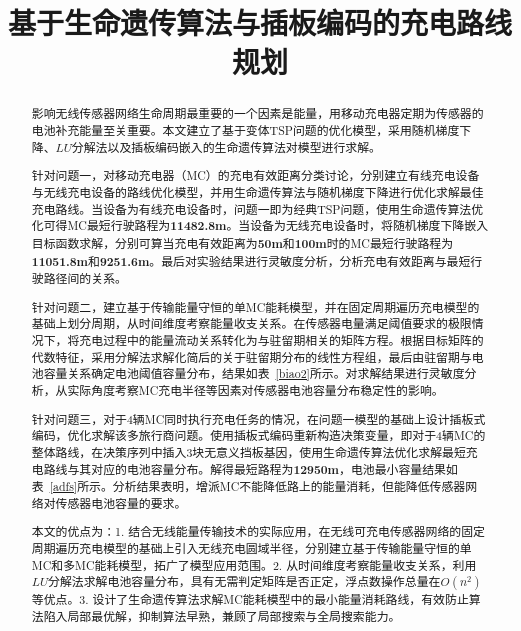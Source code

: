 \documentclass{whutmod}
\title{基于生命遗传算法与插板编码的充电路线规划}
\begin{document}
    \maketitle
    \thispagestyle{empty}

    \begin{abstract}
        影响无线传感器网络生命周期最重要的一个因素是能量，用移动充电器定期为传感器的电池补充能量至关重要。本文建立了基于变体TSP问题的优化模型，采用随机梯度下降、$LU$分解法以及插板编码嵌入的生命遗传算法对模型进行求解。

        针对问题一，对移动充电器（MC）的充电有效距离分类讨论，分别建立有线充电设备与无线充电设备的路线优化模型，并用生命遗传算法与随机梯度下降进行优化求解最佳充电路线。当设备为有线充电设备时，问题一即为经典TSP问题，使用生命遗传算法优化可得MC最短行驶路程为\textbf{11482.8m}。当设备为无线充电设备时，将随机梯度下降嵌入目标函数求解，分别可算当充电有效距离为\textbf{50m}和\textbf{100m}时的MC最短行驶路程为\textbf{11051.8m}和\textbf{9251.6m}。最后对实验结果进行灵敏度分析，分析充电有效距离与最短行驶路径间的关系。

        针对问题二，建立基于传输能量守恒的单MC能耗模型，并在固定周期遍历充电模型的基础上划分周期，从时间维度考察能量收支关系。在传感器电量满足阈值要求的极限情况下，将充电过程中的能量流动关系转化为与驻留期相关的矩阵方程。根据目标矩阵的代数特征，采用分解法求解化简后的关于驻留期分布的线性方程组，最后由驻留期与电池容量关系确定电池阈值容量分布，结果如表~\ref{biao2}所示。对求解结果进行灵敏度分析，从实际角度考察MC充电半径等因素对传感器电池容量分布稳定性的影响。

        针对问题三，对于4辆MC同时执行充电任务的情况，在问题一模型的基础上设计插板式编码，优化求解该多旅行商问题。使用插板式编码重新构造决策变量，即对于4辆MC的整体路线，在决策序列中插入3块无意义挡板基因，使用生命遗传算法优化求解最短充电路线与其对应的电池容量分布。解得最短路程为\textbf{12950m}，电池最小容量结果如表~\ref{adfs}所示。分析结果表明，增派MC不能降低路上的能量消耗，但能降低传感器网络对传感器电池容量的要求。

        本文的优点为：1. 结合无线能量传输技术的实际应用，在无线可充电传感器网络的固定周期遍历充电模型的基础上引入无线充电圆域半径，分别建立基于传输能量守恒的单MC和多MC能耗模型，拓广了模型应用范围。2. 从时间维度考察能量收支关系，利用$LU$分解法求解电池容量分布，具有无需判定矩阵是否正定，浮点数操作总量在$O(n^2)$等优点。3. 设计了生命遗传算法求解MC能耗模型中的最小能量消耗路线，有效防止算法陷入局部最优解，抑制算法早熟，兼顾了局部搜索与全局搜索能力。

    \end{abstract}
\end{document}
